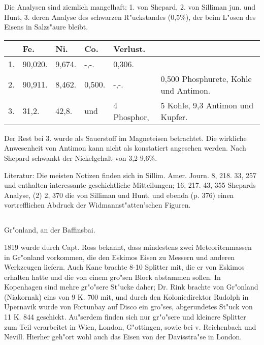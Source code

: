 \documentclass[a4paper, 11pt, oneside]{article}
\begin{document}
Die Analysen sind ziemlich mangelhaft: 1. von Shepard, 2. von Silliman jun. und Hunt, 3. deren Analyse des schwarzen R"uckstandes (0,5\%), der beim L"osen des Eisens in Salzs"aure bleibt.
\begin{table}[H]
    \centering\swabfamily\Large
    \begin{tabular}{l l l l l p{40mm}}
         & Fe. & Ni. & Co. & Verlust. &  \\ \hline
        1. & 90,020. & 9,674. & -,-. & 0,306. &  \\
        2. & 90,911. & 8,462. & 0,500. & -,-. & 0,500 Phosphurete, Kohle und Antimon.  \\
        3. & 31,2. & 42,8. & und & 4 Phosphor, &  5 Kohle, 9,3 Antimon und Kupfer.  \\
    \end{tabular}
\end{table}

Der Rest bei 3. wurde als Sauerstoff im Magneteisen betrachtet. Die wirkliche Anwesenheit von Antimon kann nicht als konstatiert angesehen werden. Nach Shepard schwankt der Nickelgehalt von 3,2-9,6\%.

\normalsize
Literatur: Die meisten Notizen finden sich in Sillim. Amer. Journ. 8, 218. 33, 257 und enthalten interessante geschichtliche Mitteilungen; 16, 217. 43, 355 Shepards Analyse, (2) 2, 370 die von Silliman und Hunt, und ebenda (p. 376) einen vortrefflichen Abdruck der Widmannst"atten'schen Figuren.

\subsection{}
\LARGE
\paragraph{}
Gr"onland, an der Baffinsbai.

1819 wurde durch Capt. Ross bekannt, dass mindestens zwei Meteoritenmassen in Gr"onland vorkommen, die den Eskimos Eisen zu Messern und anderen Werkzeugen liefern. Auch Kane brachte 8-10 Splitter mit, die er von Eskimos erhalten hatte und die von einem gro"sen Block abstammen sollen. In Kopenhagen sind mehre gr"o"sere St"ucke daher; Dr. Rink brachte von Gr"onland (Niakornak) eins von 9 K. 700 mit, und durch den Koloniedirektor Rudolph in Upernavik wurde von Fortunbay auf Disco ein gro"ses, abgerundetes St"uck von 11 K. 844 geschickt. Au"serdem finden sich nur gr"o"sere und kleinere Splitter zum Teil verarbeitet in Wien, London, G"ottingen, sowie bei v. Reichenbach und Nevill. Hierher geh"ort wohl auch das Eisen von der Davisstra"se in London.
\end{document}
